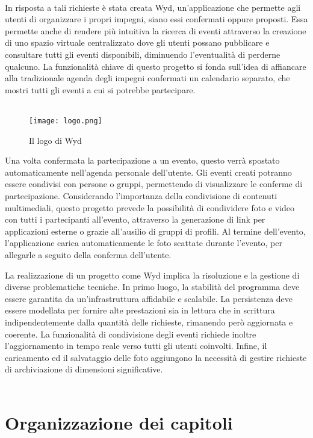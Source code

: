 \\
In risposta a tali richieste è stata creata Wyd, 
un'applicazione che permette agli utenti di organizzare i propri impegni, 
siano essi confermati oppure proposti. 
Essa permette anche di rendere più intuitiva la ricerca di eventi 
attraverso la creazione di uno spazio virtuale centralizzato 
dove gli utenti possano pubblicare e consultare tutti gli eventi disponibili,
diminuendo l’eventualità di perderne qualcuno.
La funzionalità chiave di questo progetto si fonda sull'idea di affiancare alla tradizionale agenda degli impegni confermati un calendario separato, 
che mostri tutti gli eventi a cui si potrebbe partecipare. \\
\\
\begin{wrapfigure}{r}{0.4\textwidth}
    \centering
    \texttt{[image: logo.png]}
    \caption{Il logo di Wyd}
\end{wrapfigure}	
Una volta confermata la partecipazione a un evento, 
questo verrà spostato automaticamente nell'agenda personale dell'utente.
Gli eventi creati potranno essere condivisi con persone o gruppi, 
permettendo di visualizzare le conferme di partecipazione. 
Considerando l'importanza della condivisione di contenuti multimediali, 
questo progetto prevede la possibilità di condividere foto e video con tutti i partecipanti all'evento, 
attraverso la generazione di link per applicazioni esterne o grazie all'ausilio di gruppi di profili. 
Al termine dell’evento, l'applicazione carica automaticamente le foto scattate durante l'evento,
per allegarle a seguito della conferma dell'utente.



\clearpage
La realizzazione di un progetto come Wyd implica la risoluzione e 
la gestione di diverse problematiche tecniche. 
In primo luogo, la stabilità del programma deve essere garantita 
da un'infrastruttura affidabile e scalabile. 
La persistenza deve essere modellata per fornire alte prestazioni sia in lettura che in scrittura 
indipendentemente dalla quantità delle richieste,
rimanendo però aggiornata e coerente.
La funzionalità di condivisione degli eventi richiede inoltre l'aggiornamento in tempo reale verso tutti gli utenti coinvolti.
Infine, il caricamento ed il salvataggio delle foto aggiungono la necessità di gestire richieste di archiviazione di dimensioni significative.\\
\\
\section*{Organizzazione dei capitoli}

